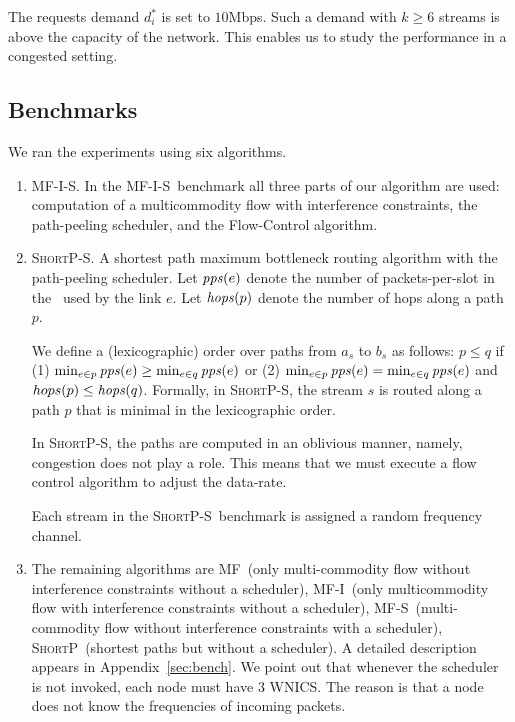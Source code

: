 \documentclass[12pt]{article}
\newenvironment{proof sketch}[1]{\noindent {\emph{Proof sketch of #1:}}}{\hfill \qed}
\newcommand{\pps}{\text{\emph{pps}}}
\newcommand{\hops}{\text{\emph{hops}}}
\newcommand{\MCS}{\text{\sc{mcs}}}
\newcommand{\algA}{\textsc{MF-I-S}}
\newcommand{\algB}{\textsc{ShortP}}
\newcommand{\algBS}{\textsc{ShortP-S}}
\newcommand{\algC}{\textsc{MF-I}}
\newcommand{\algD}{\textsc{MF}}
\newcommand{\algE}{\textsc{MF-S}}
\begin{document}
The requests demand $d^*_i$ is set to $10$Mbps. Such a demand with
$k\geq 6$ streams is above the capacity of the network. This enables
us to study the performance in a congested setting.


\subsection{Benchmarks}
We ran the experiments using six algorithms.
\begin{enumerate}
\item \algA. In the \algA\ benchmark all three parts of our algorithm
  are used: computation of a multicommodity flow with interference
  constraints, the path-peeling scheduler, and the Flow-Control
  algorithm.

\item \algBS. A shortest path maximum bottleneck routing algorithm
  with the path-peeling scheduler.  Let $\pps(e)$ denote the number of
  packets-per-slot in the \MCS\ used by the link $e$.  Let $\hops(p)$
  denote the number of hops along a path $p$.

  We define a (lexicographic) order over paths from $a_s$ to $b_s$ as
  follows: $p \leq q$ if (1) $\min_{e\in p} \pps(e) \geq \min_{e\in q}
  \pps(e)$ or (2) $\min_{e \in p} \pps(e) = \min_{e \in q} \pps(e)$
  and $hops(p) \leq \hops(q)$.  Formally, in \algBS, the stream $s$ is
  routed along a path $p$ that is minimal in the lexicographic order.

  In \algBS, the paths are computed in an oblivious manner, namely,
  congestion does not play a role. This means that we must execute a
  flow control algorithm to adjust the data-rate.

  Each stream in the \algBS\ benchmark is assigned a random
  frequency channel.
\item The remaining algorithms are \algD\ (only multi-commodity flow
  without interference constraints without a scheduler), \algC\ (only
  multicommodity flow with interference constraints without a
  scheduler), \algE\ (multi-commodity flow without interference
  constraints with a scheduler), \algB\ (shortest paths but without a
  scheduler).  A detailed description appears in
  Appendix~\ref{sec:bench}. We point out that whenever the scheduler
  is not invoked, each node must have $3$ WNICS. The reason is that a
  node does not know the frequencies of incoming packets.
\end{enumerate}
\end{document}
